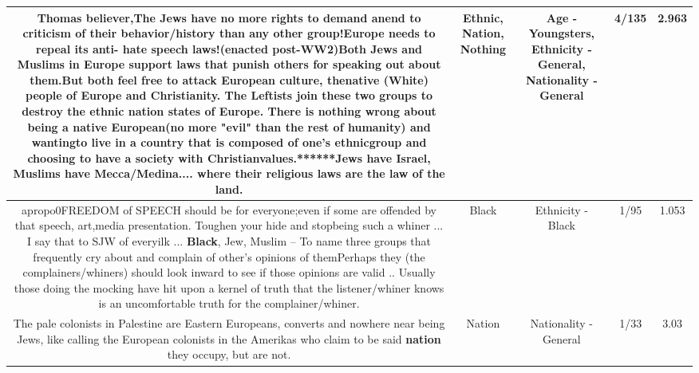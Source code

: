 \documentclass[11pt]{article}
\newlength\mylength
\begin{document}
\begin{center}
\begin{longtable}{|C{.65\mylength}|C{.30\mylength}|C{.12\mylength}|C{.12\mylength}|C{.12\mylength}|}
  \small Thomas believer,The Jews have no more rights to demand anend to criticism of their behavior/history than any other group!Europe needs to repeal its anti- hate speech laws!(enacted post-WW2)Both Jews and Muslims in Europe support laws that punish others for speaking out about them.But both feel free to attack European culture, thenative (White) people of Europe and Christianity.  The Leftists join these two groups to destroy the \textbf{ethnic} \textbf{nation} states of Europe. There is \textbf{nothing} wrong about being a native European(no more "evil" than the rest of humanity) and wantingto live in a country that is composed of one's \textbf{ethnic}group and choosing to have a society with Christianvalues.******Jews have Israel, Muslims have Mecca/Medina.... where their religious laws are the law of the land.\normalsize   & Ethnic, Nation, Nothing & Age - Youngsters, Ethnicity - General, Nationality - General & 4/135 & 2.963 \\  \hline
  \small apropo0FREEDOM of SPEECH should be for everyone;even if some are offended by that speech, art,media presentation.  Toughen your hide and stopbeing such a whiner ... I say that to SJW of everyilk ... \textbf{Black}, Jew, Muslim -- To name three groups that frequently cry about and complain of other's opinions of themPerhaps they (the complainers/whiners) should look inward to see if those opinions are valid .. Usually those doing the mocking have hit upon a kernel of truth that the listener/whiner knows is an uncomfortable truth for the complainer/whiner.\normalsize   & Black & Ethnicity - Black & 1/95 & 1.053 \\  \hline
  \small The pale colonists in Palestine are Eastern Europeans, converts and nowhere near being Jews, like calling the European colonists in the Amerikas who claim to be said \textbf{nation} they occupy, but are not.\normalsize   & Nation & Nationality - General & 1/33 & 3.03 \\  \hline

\end{longtable}
\end{center}
\end{document}
